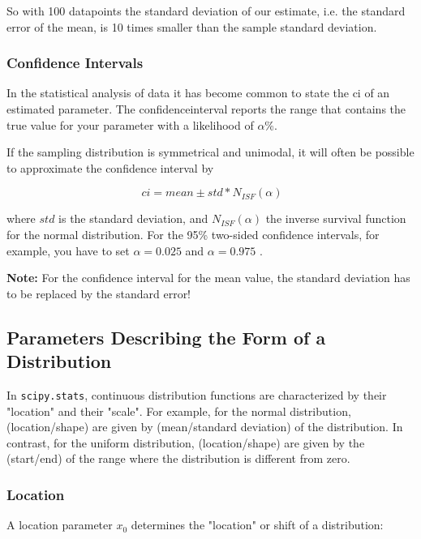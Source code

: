 So with 100 datapoints the standard deviation of our estimate, i.e. the standard error of the mean, is 10 times smaller than the sample standard deviation.

\subsubsection{Confidence Intervals}

 In the statistical analysis of data it has become common to state the \acrfull{ci} of an estimated parameter. The \gls{confidenceinterval} reports the range that contains the true value for your parameter with a likelihood of $\alpha$\%.

If the sampling distribution is symmetrical and unimodal, it will often be possible to approximate the confidence interval by

\begin{equation}\
  ci = mean \pm std * N_{ISF}(\alpha)
\end{equation}\label{eq:ci}

where $std$ is the  standard deviation, and $N_{ISF}(\alpha)$ the inverse survival function for the normal distribution. For the 95\% two-sided confidence intervals, for example, you have to set $\alpha=0.025$ and $\alpha=0.975$ .

\textbf{Note:} For the confidence interval for the mean value, the standard deviation has to be replaced by the standard error!

\subsection{Parameters Describing the Form of a Distribution}

In \texttt{scipy.stats}, continuous distribution functions are characterized by their "location" and their "scale". 
For example, for the normal distribution, (location/shape) are given by (mean/standard deviation) of the distribution. In contrast, for the uniform distribution, (location/shape) are given by the (start/end) of the range where the distribution is different from zero.

\subsubsection{Location}

A \gls{location} parameter $x_0$  determines the "location" or shift of a distribution:

